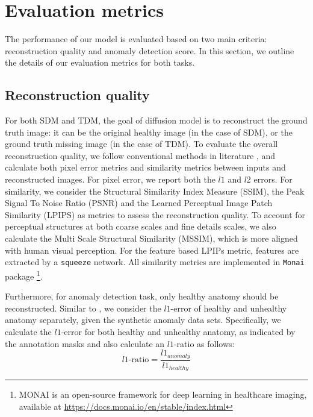 \section{Evaluation metrics}

The performance of our model is evaluated based on two main criteria: reconstruction quality and anomaly detection score. In this section, we outline the details of our evaluation metrics for both tasks. 

\subsection{Reconstruction quality}

For both SDM and TDM, the goal of diffusion model is to reconstruct the ground truth image: it can be the original healthy image (in the case of SDM), or the ground truth missing image (in the case of TDM). To evaluate the overall reconstruction quality, we follow conventional methods in literature \cite{rombachLDM, lozuponeLDAE2025, behrendt2025cDDPM}, and calculate both pixel error metrics and similarity metrics between inputs and reconstructed images. For pixel error, we report both the $l1$ and $l2$ errors. For similarity, we consider the Structural Similarity Index Measure (SSIM), the Peak Signal To Noise Ratio (PSNR) and the Learned Perceptual Image Patch Similarity (LPIPS) as metrics to assess the reconstruction quality. To account for perceptual structures at both coarse scales and fine details scales, we also calculate the Multi Scale Structural Similarity (MSSIM), which is more aligned with human visual perception. For the feature based LPIPs metric, features are extracted by a \texttt{squeeze} network. All similarity metrics are implemented in \texttt{Monai} package \footnote{MONAI is an open-source framework for deep learning in healthcare imaging, available at \href{https://docs.monai.io/en/stable/index.html}{https://docs.monai.io/en/stable/index.html}}. 

Furthermore, for anomaly detection task, only healthy anatomy should be reconstructed. Similar to \cite{behrendt2025cDDPM}, we consider the $l1$-error of healthy and unhealthy anatomy separately, given the synthetic anomaly data sets. Specifically, we calculate the $l1$-error for both healthy and unhealthy anatomy, as indicated by the annotation masks and also calculate an $l1$-ratio as follows:
\begin{equation}
    l1\text{-ratio} = \frac{l1_{anomaly}}{l1_{healthy}}
    \label{eq:l1-ratio}
\end{equation}

